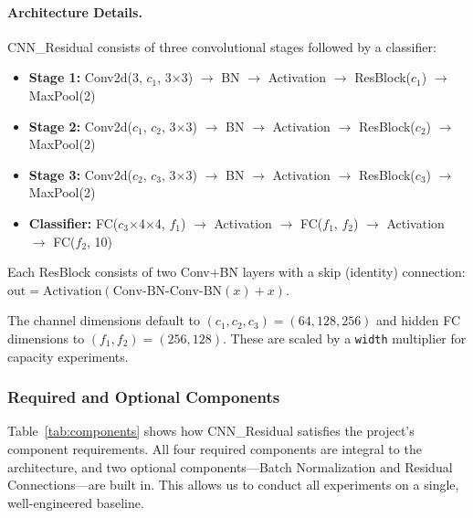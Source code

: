 \documentclass[11pt,a4paper]{article}
\begin{document}
\paragraph{Architecture Details.} CNN\_Residual consists of three convolutional stages followed by a classifier:

\begin{itemize}[nosep]
    \item \textbf{Stage 1:} Conv2d(3, $c_1$, 3$\times$3) $\rightarrow$ BN $\rightarrow$ Activation $\rightarrow$ ResBlock($c_1$) $\rightarrow$ MaxPool(2)
    \item \textbf{Stage 2:} Conv2d($c_1$, $c_2$, 3$\times$3) $\rightarrow$ BN $\rightarrow$ Activation $\rightarrow$ ResBlock($c_2$) $\rightarrow$ MaxPool(2)
    \item \textbf{Stage 3:} Conv2d($c_2$, $c_3$, 3$\times$3) $\rightarrow$ BN $\rightarrow$ Activation $\rightarrow$ ResBlock($c_3$) $\rightarrow$ MaxPool(2)
    \item \textbf{Classifier:} FC($c_3$$\times$4$\times$4, $f_1$) $\rightarrow$ Activation $\rightarrow$ FC($f_1$, $f_2$) $\rightarrow$ Activation $\rightarrow$ FC($f_2$, 10)
\end{itemize}

Each ResBlock consists of two Conv+BN layers with a skip (identity) connection:
$\text{out} = \text{Activation}(\text{Conv-BN-Conv-BN}(x) + x)$.

The channel dimensions default to $(c_1, c_2, c_3) = (64, 128, 256)$ and hidden FC dimensions to $(f_1, f_2) = (256, 128)$. These are scaled by a \texttt{width} multiplier for capacity experiments.

\subsubsection{Required and Optional Components}

Table~\ref{tab:components} shows how CNN\_Residual satisfies the project's component requirements. All four required components are integral to the architecture, and two optional components—Batch Normalization and Residual Connections—are built in. This allows us to conduct all experiments on a single, well-engineered baseline.
\end{document}
